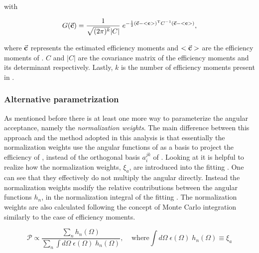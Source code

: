 \noindent with

\begin{equation}
\centering
  G(\vec{\bf{c}}) = \frac{1}{\sqrt{(2\pi)^k}|C|} \; e^{-\frac{1}{2}(  \vec{\bf{c}} - <{\bf{c}}>  )^{\text{T}} C^{-1} (\vec{\bf{c}} - <{\bf{c}}> ) },
\label{mvm_constr_gauss}
\end{equation}

\noindent where $\vec{\bf c}$ represents the estimated efficiency moments and $<\vec{\bf c}>$ are the efficiency moments
of . $C$ and $|C|$ are the covariance matrix of the efficiency moments and its determinant respectively.
Lastly, $k$ is the number of efficiency moments present in .

\subsubsection{Alternative parametrization}
As mentioned before there is at least one more way to parameterize the angular acceptance, namely the \emph{normalization weights}.
The main difference between this approach and the method adopted in this analysis is that essentially the normalization weights use the angular functions
of  as a basis to project the efficiency of , instead of the orthogonal basis $a_i^{jk}$ of .
Looking at  it is helpful to realize how the normalization weights, $\xi_a$, are introduced into the fitting \pdf.
One can see that they effectively do not multiply the angular \pdf directly. Instead the normalization weights modify the relative contributions
between the angular functions $h_n$, in the normalization integral of the fitting \pdf. The normalization weights are also calculated following the concept of Monte Carlo integration
similarly to the case of efficiency moments.

\begin{equation}
  \mathcal{P} \propto \frac{\sum_n h_n(\Omega)}{\sum_n \int d\Omega \; \epsilon(\Omega) \; h_n(\Omega)}, \;\;\;\;\text{where} \int d\Omega \; \epsilon(\Omega) \; h_n(\Omega) \equiv \xi_a
  \label{norm_weights_pdf}
\end{equation}


